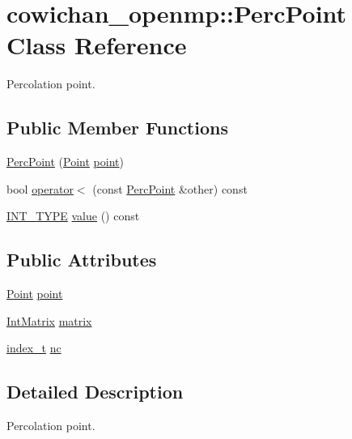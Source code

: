 \hypertarget{classcowichan__openmp_1_1_perc_point}{
\section{cowichan\_\-openmp::PercPoint Class Reference}
\label{classcowichan__openmp_1_1_perc_point}
}
Percolation point.  


\subsection*{Public Member Functions}
\begin{CompactItemize}
\item 
\hyperlink{classcowichan__openmp_1_1_perc_point_81ced481b96424cb9e44c8eb784d00dd}{PercPoint} (\hyperlink{class_point}{Point} \hyperlink{classcowichan__openmp_1_1_perc_point_a6dc78f386f5b285da81fae978af9107}{point})
\item 
bool \hyperlink{classcowichan__openmp_1_1_perc_point_7796aaf1ba591cd821f7f5e89f8f6550}{operator$<$} (const \hyperlink{classcowichan__openmp_1_1_perc_point}{PercPoint} \&other) const 
\item 
\hyperlink{cowichan_8hpp_c96945095fd0ce7186a1d00a89f77d2c}{INT\_\-TYPE} \hyperlink{classcowichan__openmp_1_1_perc_point_f6359d4fe7c6f64fc80a4ac14327f0a4}{value} () const 
\end{CompactItemize}
\subsection*{Public Attributes}
\begin{CompactItemize}
\item 
\hyperlink{class_point}{Point} \hyperlink{classcowichan__openmp_1_1_perc_point_a6dc78f386f5b285da81fae978af9107}{point}
\item 
\hyperlink{cowichan_8hpp_82321152ddeeefe9c61350a42ed9e7af}{IntMatrix} \hyperlink{classcowichan__openmp_1_1_perc_point_73e69a16d466989c650d4a4f00725ac0}{matrix}
\item 
\hyperlink{cowichan_8hpp_5b04577d5d21124855deaad298595371}{index\_\-t} \hyperlink{classcowichan__openmp_1_1_perc_point_89fe3a98f39c289fd289998430a4cba3}{nc}
\end{CompactItemize}


\subsection{Detailed Description}
Percolation point. 

